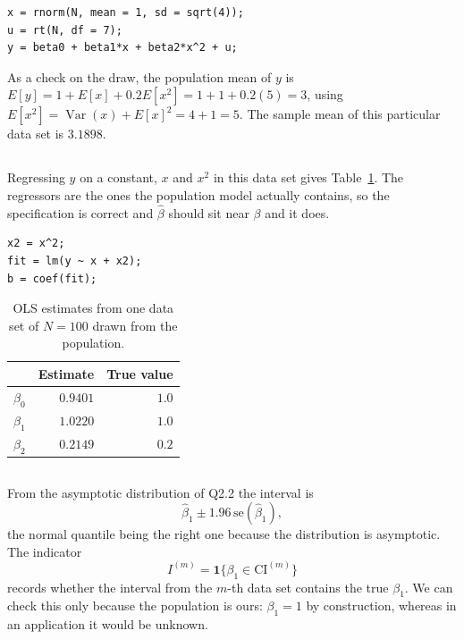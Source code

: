 \documentclass[11pt]{article}
\newcommand{\code}[1]{\texttt{#1}}
\DeclareMathOperator{\Var}{Var}
\begin{document}
\begin{lstlisting}[style=Rcode,caption={Drawing one data set (excerpt from
\code{R/q4\_coverage\_rate.R}).},label={lst:q4-draw}]
x = rnorm(N, mean = 1, sd = sqrt(4));
u = rt(N, df = 7);
y = beta0 + beta1*x + beta2*x^2 + u;
\end{lstlisting}

As a check on the draw, the population mean of $y$ is
$E[y] = 1 + E[x] + 0.2E[x^2] = 1 + 1 + 0.2(5) = 3$, using
$E[x^2] = \Var(x) + E[x]^2 = 4 + 1 = 5$. The sample mean of this particular
data set is $3.1898$.

\subsection{}
Regressing $y$ on a constant, $x$ and $x^2$ in this data set gives
Table~\ref{tab:q4-ols}. The regressors are the ones the population model
actually contains, so the specification is correct and $\hat\beta$ should sit
near $\beta$ and it does.

\begin{lstlisting}[style=Rcode,caption={The OLS estimate (excerpt from
\code{R/q4\_coverage\_rate.R}).},label={lst:q4-ols}]
x2 = x^2;
fit = lm(y ~ x + x2);
b = coef(fit);
\end{lstlisting}

\begin{table}[htbp]
\centering
\caption{OLS estimates from one data set of $N = 100$ drawn from the
population.}
\label{tab:q4-ols}
\small
\begin{tabular}{lrr}
\toprule
& Estimate & True value \\
\midrule
$\beta_0$ & $0.9401$ & $1.0$ \\
$\beta_1$ & $1.0220$ & $1.0$ \\
$\beta_2$ & $0.2149$ & $0.2$ \\
\bottomrule
\end{tabular}
\end{table}

\subsection{}
From the asymptotic distribution of Q2.2 the interval is
\[
\hat\beta_1 \pm 1.96\,\text{se}(\hat\beta_1),
\]
the normal quantile being the right one because the distribution is
asymptotic. The indicator
\[
I^{(m)} = \mathbf{1}\{\beta_1 \in \text{CI}^{(m)}\}
\]
records whether the interval from the $m$-th data set contains the true
$\beta_1$. We can check this only because the population is ours:
$\beta_1 = 1$ by construction, whereas in an application it would be unknown.
\end{document}
